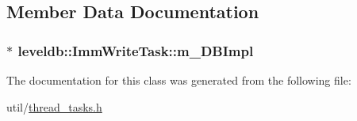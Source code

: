 \subsection{Member Data Documentation}
\hypertarget{classleveldb_1_1_imm_write_task_a97940b9c99aba9e6b46b80c77d8a07c6}{}
\subsubsection[{m\+\_\+\+D\+B\+Impl}]{$\ast$ leveldb\+::\+Imm\+Write\+Task\+::m\+\_\+\+D\+B\+Impl\hspace{0.3cm}{\ttfamily [protected]}}\label{classleveldb_1_1_imm_write_task_a97940b9c99aba9e6b46b80c77d8a07c6}


The documentation for this class was generated from the following file\+:\begin{DoxyCompactItemize}
\item 
util/\hyperlink{thread__tasks_8h}{thread\+\_\+tasks.\+h}\end{DoxyCompactItemize}

